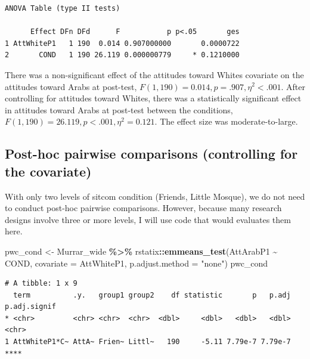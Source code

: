 \documentclass[
  11pt,
]{book}
\newenvironment{Shaded}{\begin{snugshade}}{\end{snugshade}}
\newcommand{\AttributeTok}[1]{\textcolor[rgb]{0.27,0.27,0.27}{#1}}
\newcommand{\FunctionTok}[1]{\textcolor[rgb]{0.27,0.27,0.27}{\textbf{#1}}}
\newcommand{\NormalTok}[1]{#1}
\newcommand{\OtherTok}[1]{\textcolor[rgb]{0.37,0.37,0.37}{#1}}
\newcommand{\SpecialCharTok}[1]{\textcolor[rgb]{0.43,0.43,0.43}{\textbf{#1}}}
\newcommand{\StringTok}[1]{\textcolor[rgb]{0.5,0.5,0.5}{#1}}
\begin{document}
\begin{verbatim}
ANOVA Table (type II tests)

      Effect DFn DFd      F           p p<.05       ges
1 AttWhiteP1   1 190  0.014 0.907000000       0.0000722
2       COND   1 190 26.119 0.000000779     * 0.1210000
\end{verbatim}

There was a non-significant effect of the attitudes toward Whites covariate on the attitudes toward Arabs at post-test, \(F (1, 190) = 0.014, p = .907, \eta^2 < .001\). After controlling for attitudes toward Whites, there was a statistically significant effect in attitudes toward Arabs at post-test between the conditions, \(F(1, 190) = 26.119, p < .001, \eta^2 = 0.121\). The effect size was moderate-to-large.

\hypertarget{post-hoc-pairwise-comparisons-controlling-for-the-covariate-1}{%
\subsection{Post-hoc pairwise comparisons (controlling for the covariate)}\label{post-hoc-pairwise-comparisons-controlling-for-the-covariate-1}}

With only two levels of sitcom condition (Friends, Little Mosque), we do not need to conduct post-hoc pairwise comparisons. However, because many research designs involve three or more levels, I will use code that would evaluates them here.

\begin{Shaded}
\begin{Highlighting}[]
\NormalTok{pwc\_cond }\OtherTok{\textless{}{-}}\NormalTok{ Murrar\_wide }\SpecialCharTok{\%\textgreater{}\%}
\NormalTok{    rstatix}\SpecialCharTok{::}\FunctionTok{emmeans\_test}\NormalTok{(AttArabP1 }\SpecialCharTok{\textasciitilde{}}\NormalTok{ COND, }\AttributeTok{covariate =}\NormalTok{ AttWhiteP1, }\AttributeTok{p.adjust.method =} \StringTok{"none"}\NormalTok{)}
\NormalTok{pwc\_cond}
\end{Highlighting}
\end{Shaded}

\begin{verbatim}
# A tibble: 1 x 9
  term          .y.   group1 group2    df statistic       p   p.adj p.adj.signif
* <chr>         <chr> <chr>  <chr>  <dbl>     <dbl>   <dbl>   <dbl> <chr>       
1 AttWhiteP1*C~ AttA~ Frien~ Littl~   190     -5.11 7.79e-7 7.79e-7 ****        
\end{verbatim}
\end{document}
